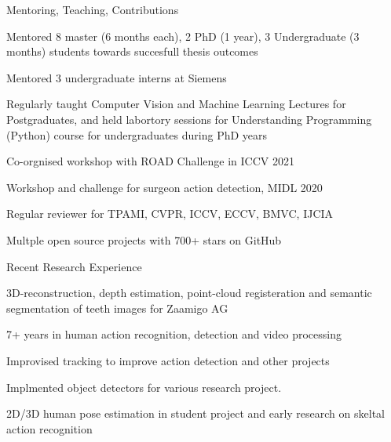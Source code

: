 \documentclass{resume} %
\begin{document}
\begin{multicols}{2}
\begin{mSection}{Mentoring, Teaching, Contributions}{} 
  \begin{sSubsection}{Mentored 8 master (6 months each), 2 PhD (1 year), 3 Undergraduate (3 months) students towards succesfull thesis outcomes}\end{sSubsection}
  \begin{sSubsection}{Mentored 3 undergraduate interns at Siemens}\end{sSubsection}
  \begin{sSubsection}{Regularly taught Computer Vision and Machine Learning Lectures for Postgraduates, 
    and held labortory sessions for Understanding Programming (Python) course for undergraduates during PhD years}\end{sSubsection}
  \begin{sSubsection}{Co-orgnised workshop with ROAD Challenge in ICCV 2021}\end{sSubsection}
  \begin{sSubsection}{Workshop and challenge for surgeon action detection, MIDL 2020}\end{sSubsection}
  \begin{sSubsection}{Regular reviewer for TPAMI, CVPR, ICCV, ECCV, BMVC, IJCIA}\end{sSubsection}
  \begin{sSubsection}{Multple open source projects with 700+ stars on GitHub}\end{sSubsection}
\end{mSection}

\begin{mSection}{Recent Research Experience}{} 
  \begin{sSubsection}{3D-reconstruction, depth estimation, point-cloud registeration and semantic segmentation of teeth images for Zaamigo AG}\end{sSubsection}
  \begin{sSubsection}{7+ years in human action recognition, detection and  video processing}\end{sSubsection}
  \begin{sSubsection}{Improvised tracking to improve action detection and other projects}\end{sSubsection}
  \begin{sSubsection}{Implmented object detectors for various research project.}\end{sSubsection}
  \begin{sSubsection}{2D/3D human pose estimation in student project and early research on skeltal action recognition}\end{sSubsection}

\end{mSection}

\end{multicols}
\end{document}
